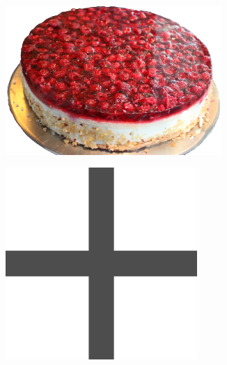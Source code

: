 \documentclass[utf8]{beamer}
\begin{document}
	\begin{frame}
		\begin{figure}
			\begin{subfigure}[b]{0.25\textwidth}
				\includegraphics[width=0.9\textwidth]{img/Keoln_Maerz_2009_PD_20090327_086-freigestellt3.png}
			\end{subfigure}%
			\begin{subfigure}[b]{0.15\textwidth}
				\includegraphics[width=0.8\textwidth]{img/text3837.png}
			\end{subfigure}%
			\begin{subfigure}[b]{0.25\textwidth}

\end{subfigure}
\end{figure}
\end{frame}
\end{document}
